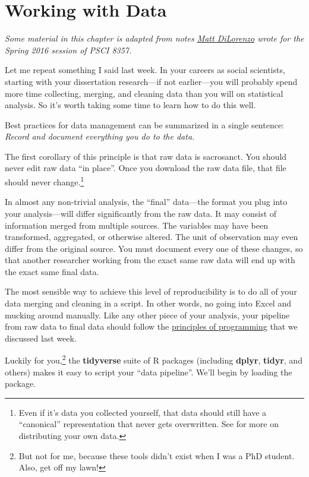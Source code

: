 \documentclass[12pt,oneside,openany]{tufte-book}
\begin{document}
\chapter{Working with Data}\label{data}

\emph{Some material in this chapter is adapted from notes
\href{http://mdilorenzo.github.io}{Matt DiLorenzo} wrote for the Spring
2016 session of PSCI 8357.}

Let me repeat something I said last week. In your careers as social
scientists, starting with your dissertation research---if not
earlier---you will probably spend more time collecting, merging, and
cleaning data than you will on statistical analysis. So it's worth
taking some time to learn how to do this well.

Best practices for data management can be summarized in a single
sentence: \emph{Record and document everything you do to the data.}

The first corollary of this principle is that raw data is sacrosanct.
You should never edit raw data ``in place''. Once you download the raw
data file, that file should never change.\footnote{Even if it's data you
  collected yourself, that data should still have a ``canonical''
  representation that never gets overwritten. See \citet{Leek:2015uw}
  for more on distributing your own data.}

In almost any non-trivial analysis, the ``final'' data---the format you
plug into your analysis---will differ significantly from the raw data.
It may consist of information merged from multiple sources. The
variables may have been transformed, aggregated, or otherwise altered.
The unit of observation may even differ from the original source. You
must document every one of these changes, so that another researcher
working from the exact same raw data will end up with the exact same
final data.

The most sensible way to achieve this level of reproducibility is to do
all of your data merging and cleaning in a script. In other words, no
going into Excel and mucking around manually. Like any other piece of
your analysis, your pipeline from raw data to final data should follow
the \protect\hyperlink{programming}{principles of programming} that we
discussed last week.

Luckily for you,\footnote{But not for me, because these tools didn't
  exist when I was a PhD student. Also, get off my lawn!} the
\textbf{tidyverse} suite of R packages (including \textbf{dplyr},
\textbf{tidyr}, and others) makes it easy to script your ``data
pipeline''. We'll begin by loading the package.
\end{document}
